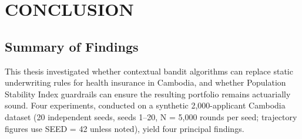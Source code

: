 \chapter{CONCLUSION}\label{chapter-vi.-conclusion}

\section{Summary of Findings}\label{summary-of-findings}

This thesis investigated whether contextual bandit algorithms can replace static underwriting rules for health insurance in Cambodia, and whether Population Stability Index guardrails can ensure the resulting portfolio remains actuarially sound. Four experiments, conducted on a synthetic 2,000-applicant Cambodia dataset (20 independent seeds, seeds 1--20, N = 5,000 rounds per seed; trajectory figures use SEED = 42 unless noted), yield four principal findings.

